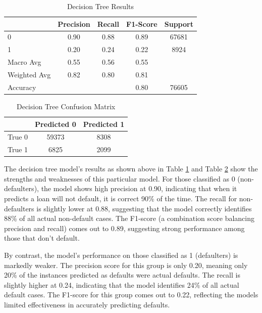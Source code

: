 \documentclass[12pt]{article}
\begin{document}
\begin{table}[htbp]
    \centering
    \caption{Decision Tree Results}
    \begin{tabular}{lcccc}
        \toprule
        & Precision & Recall & F1-Score & Support \\
        \midrule
        0 & 0.90 & 0.88 & 0.89 & 67681 \\
        1 & 0.20 & 0.24 & 0.22 & 8924 \\
        Macro Avg & 0.55 & 0.56 & 0.55 & \\
        Weighted Avg & 0.82 & 0.80 & 0.81 & \\
        \midrule
        Accuracy & & & 0.80 & 76605 \\
        \bottomrule
    \end{tabular}
    \label{table:decisionTreeResults}
\end{table}

\begin{table}[htbp]
    \centering
    \caption{Decision Tree Confusion Matrix}
    \begin{tabular}{lcc}
        \toprule
        & Predicted 0 & Predicted 1 \\
        \midrule
        True 0 & 59373 & 8308 \\
        True 1 & 6825 & 2099 \\
        \bottomrule
    \end{tabular}
    \label{table:decisionTreeConfusionMatrix}
\end{table}

The decision tree model's results as shown above in Table \ref{table:decisionTreeResults} and Table \ref{table:decisionTreeConfusionMatrix} show the strengths and weaknesses of this particular model. For those classified as 0 (non-defaulters), the model shows high precision at 0.90, indicating that when it predicts a loan will not default, it is correct 90\% of the time. The recall for non-defaulters is slightly lower at 0.88, suggesting that the model correctly identifies 88\% of all actual non-default cases. The F1-score (a combination score balancing precision and recall) comes out to 0.89, suggesting strong performance among those that don't default.

By contrast, the model's performance on those classified as 1 (defaulters) is markedly weaker. The precision score for this group is only 0.20, meaning only 20\% of the instances predicted as defaults were actual defaults. The recall is slightly higher at 0.24, indicating that the model identifies 24\% of all actual default cases. The F1-score for this group comes out to 0.22, reflecting the models limited effectiveness in accurately predicting defaults.
\end{document}
